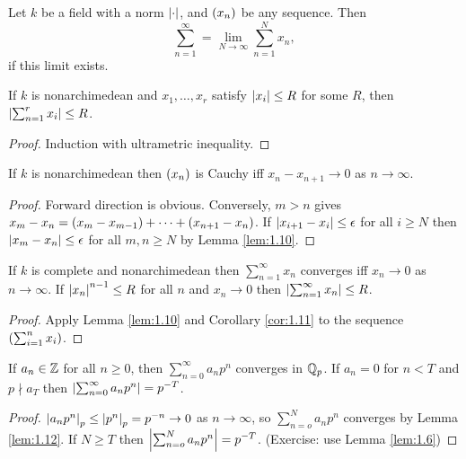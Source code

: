 \pagebreak

\begin{definition}
Let $ k $ be a field with a norm $ \left\lvert \cdot \right\rvert $, and $ \left( x_n \right) $ be any sequence. Then
$$ \sum_{n = 1}^\infty = \lim_{N \to \infty} \sum_{n = 1}^N x_n, $$
if this limit exists.
\end{definition}

\begin{lemma}
\label{lem:1.10}
If $ k $ is nonarchimedean and $ x_1, \dots, x_r $ satisfy $ \left\lvert x_i \right\rvert \le R $ for some $ R $, then $ \left\lvert \sum_{n = 1}^r x_i \right\rvert \le R $.
\end{lemma}

\begin{proof}
Induction with ultrametric inequality.
\end{proof}

\begin{corollary}
\label{cor:1.11}
If $ k $ is nonarchimedean then $ \left( x_n \right) $ is Cauchy iff $ x_n - x_{n + 1} \to 0 $ as $ n \to \infty $.
\end{corollary}

\begin{proof}
Forward direction is obvious. Conversely, $ m > n $ gives $ x_m - x_n = \left( x_m - x_{m - 1} \right) + \dots + \left( x_{n + 1} - x_n \right) $. If $ \left\lvert x_{i + 1} - x_i \right\rvert \le \epsilon $ for all $ i \ge N $ then $ \left\lvert x_m - x_n \right\rvert \le \epsilon $ for all $ m, n \ge N $ by Lemma \ref{lem:1.10}.
\end{proof}

\begin{lemma}
\label{lem:1.12}
If $ k $ is complete and nonarchimedean then $ \sum_{n = 1}^\infty x_n $ converges iff $ x_n \to 0 $ as $ n \to \infty $. If $ \left\lvert x_n \right\rvert^{n - 1} \le R $ for all $ n $ and $ x_n \to 0 $ then $ \left\lvert \sum_{n = 1}^\infty x_n \right\rvert \le R $.
\end{lemma}

\begin{proof}
Apply Lemma \ref{lem:1.10} and Corollary \ref{cor:1.11} to the sequence $ \left( \sum_{i = 1}^n x_i \right) $.
\end{proof}

\begin{lemma}
\label{lem:1.13}
If $ a_n \in \mathbb{Z} $ for all $ n \ge 0 $, then $ \sum_{n = 0}^\infty a_np^n $ converges in $ \mathbb{Q}_p $. If $ a_n = 0 $ for $ n < T $ and $ p \nmid a_T $ then $ \left\lvert \sum_{n = 0}^\infty a_np^n \right\rvert = p^{-T} $.
\end{lemma}

\begin{proof}
$ \left\lvert a_np^n \right\rvert_p \le \left\lvert p^n \right\rvert_p = p^{-n} \to 0 $ as $ n \to \infty $, so $ \sum_{n = o}^N a_np^n $ converges by Lemma \ref{lem:1.12}. If $ N \ge T $ then $ \left\lvert \sum_{n = o}^N a_np^n \right\rvert = p^{-T} $. (Exercise: use Lemma \ref{lem:1.6})
\end{proof}

